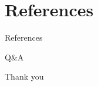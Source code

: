 \documentclass[notheorems, aspectratio=54]{beamer}
\begin{document}
\section{References}
\begin{frame}{References}
	\nocite{*}
	\newpage\cleardoublepage
	
\end{frame}
\begin{frame}{Q\&A}
	\begin{center}
		\Huge Thank you
	\end{center}
\end{frame}
\end{document}
